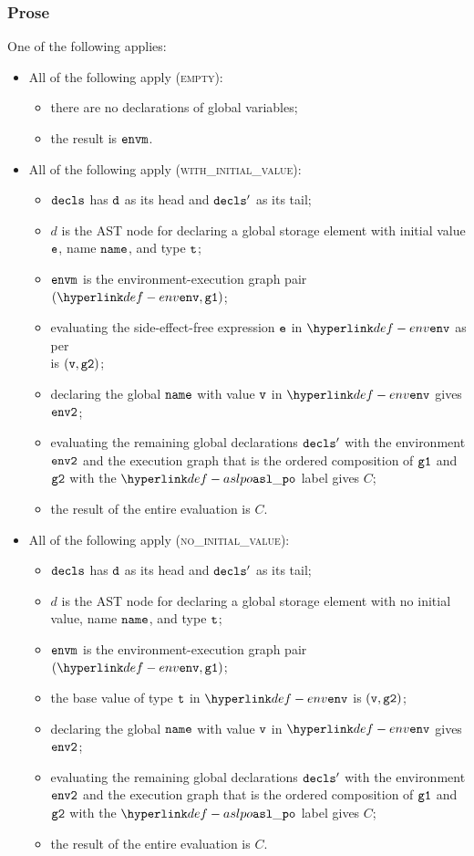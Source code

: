 \subsubsection{Prose}
One of the following applies:
\begin{itemize}
  \item All of the following apply (\textsc{empty}):
  \begin{itemize}
    \item there are no declarations of global variables;
    \item the result is $\texttt{envm}$.
  \end{itemize}

  \item All of the following apply (\textsc{with\_initial\_value}):
  \begin{itemize}
    \item $\texttt{decls}$ has $\texttt{d}$ as its head and $\texttt{decls}'$ as its tail;
    \item $d$ is the AST node for declaring a global storage element with initial value $\texttt{e}$,
    name $\texttt{name}$, and type $\texttt{t}$;
    \item $\texttt{envm}$ is the environment-execution graph pair $(\env, \vgone)$;
    \item evaluating the side-effect-free expression $\texttt{e}$ in $\env$ as per  \\
    is $(\texttt{v}, \texttt{g2})$\ProseOrError;
    \item declaring the global $\texttt{name}$ with value $\texttt{v}$ in $\env$ gives $\texttt{env2}$;
    \item evaluating the remaining global declarations $\texttt{decls}'$ with the environment $\texttt{env2}$ and the execution graph
    that is the ordered composition of $\texttt{g1}$ and $\texttt{g2}$ with the $\aslpo$ label gives $C$;
    \item the result of the entire evaluation is $C$.
  \end{itemize}

  \item All of the following apply (\textsc{no\_initial\_value}):
  \begin{itemize}
    \item $\texttt{decls}$ has $\texttt{d}$ as its head and $\texttt{decls}'$ as its tail;
    \item $d$ is the AST node for declaring a global storage element with no initial value,
    name $\texttt{name}$, and type $\texttt{t}$;
    \item $\texttt{envm}$ is the environment-execution graph pair $(\env, \vgone)$;
    \item the base value of type $\texttt{t}$ in $\env$ is $(\texttt{v}, \texttt{g2})$\ProseOrError;
    \item declaring the global $\texttt{name}$ with value $\texttt{v}$ in $\env$ gives $\texttt{env2}$;
    \item evaluating the remaining global declarations $\texttt{decls}'$ with the environment $\texttt{env2}$ and the execution graph
    that is the ordered composition of $\texttt{g1}$ and $\texttt{g2}$ with the $\aslpo$ label gives $C$;
    \item the result of the entire evaluation is $C$.
  \end{itemize}
\end{itemize}
